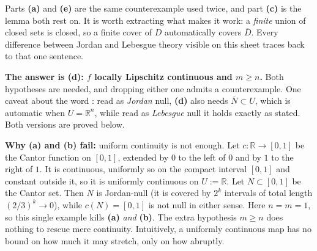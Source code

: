 \begin{exercisesolution}
\begin{ainote}
Parts \textbf{(a)} and \textbf{(e)} are the same counterexample used twice, and part \textbf{(c)}
is the lemma both rest on. It is
worth extracting what makes it work: a \emph{finite} union of closed sets is closed, so a finite
cover of $D$ automatically covers $\overline D$. Every difference between Jordan and Lebesgue
theory visible on this sheet traces back to that one sentence.
\end{ainote}
\end{exercisesolution}

\begin{exercisesolution}
\label{sol:jordan_null_image_lipschitz_choice}
\textbf{The answer is (d): $f$ locally Lipschitz continuous and $m \geq n$.} Both hypotheses
are needed, and dropping either one admits a counterexample. One caveat about the word
: read as \emph{Jordan} null, \textbf{(d)} also needs $\overline N \subset U$, which is
automatic when $U = \mathbb{R}^n$, while read as \emph{Lebesgue} null it holds exactly as stated.
Both versions are proved below.

\textbf{Why (a) and (b) fail:} uniform continuity is not enough. Let $c : \mathbb{R} \to [0,1]$
be the Cantor function on $[0,1]$, extended by $0$ to the left of $0$ and by $1$ to the right of
$1$. It is continuous, uniformly so on the compact interval $[0,1]$ and constant outside it, so
it is uniformly continuous on $U := \mathbb{R}$. Let $N \subset [0,1]$ be the Cantor set. Then
$N$ is Jordan-null (it is covered by $2^k$ intervals of total length $(2/3)^k \to 0$), while
$c(N) = [0,1]$ is not null in either sense. Here $n = m = 1$, so this single example kills
\textbf{(a)} \emph{and} \textbf{(b)}. The extra hypothesis $m \geq n$ does nothing to rescue mere
continuity. Intuitively, a uniformly continuous map has no bound on how much it may stretch, only
on how abruptly.


\end{exercisesolution}
